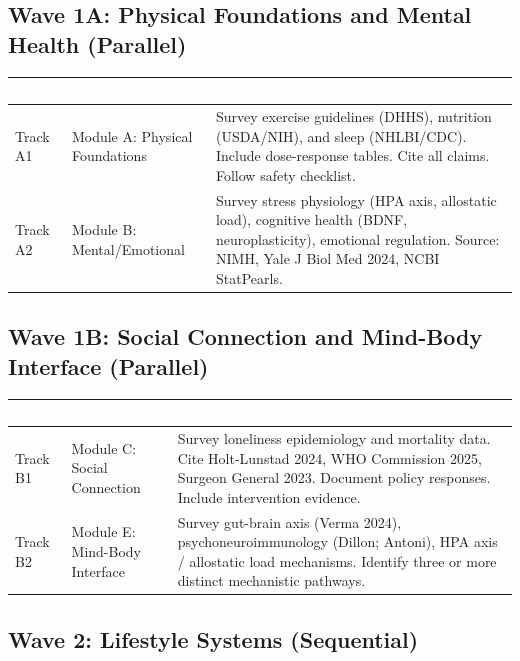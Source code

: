 \documentclass[11pt,letterpaper]{article}
\newcommand{\tableheader}[1]{\textbf{\sffamily\textcolor{white}{#1}}}
\begin{document}
\subsection{Wave 1A: Physical Foundations and Mental Health (Parallel)}

\begin{center}
\begin{tabularx}{\textwidth}{L{2cm}L{4cm}X}
\toprule
{}
\tableheader{Track} & \tableheader{Module} & \tableheader{Agent Instructions} \\
\midrule
Track A1 & Module A: Physical Foundations & Survey exercise guidelines (DHHS), nutrition (USDA/NIH), and sleep (NHLBI/CDC). Include dose-response tables. Cite all claims. Follow safety checklist. \\
Track A2 & Module B: Mental/Emotional & Survey stress physiology (HPA axis, allostatic load), cognitive health (BDNF, neuroplasticity), emotional regulation. Source: NIMH, Yale J Biol Med 2024, NCBI StatPearls. \\
\bottomrule
\end{tabularx}
\end{center}

\subsection{Wave 1B: Social Connection and Mind-Body Interface (Parallel)}

\begin{center}
\begin{tabularx}{\textwidth}{L{2cm}L{4cm}X}
\toprule
{}
\tableheader{Track} & \tableheader{Module} & \tableheader{Agent Instructions} \\
\midrule
Track B1 & Module C: Social Connection & Survey loneliness epidemiology and mortality data. Cite Holt-Lunstad 2024, WHO Commission 2025, Surgeon General 2023. Document policy responses. Include intervention evidence. \\
Track B2 & Module E: Mind-Body Interface & Survey gut-brain axis (Verma 2024), psychoneuroimmunology (Dillon; Antoni), HPA axis / allostatic load mechanisms. Identify three or more distinct mechanistic pathways. \\
\bottomrule
\end{tabularx}
\end{center}

\subsection{Wave 2: Lifestyle Systems (Sequential)}
\end{document}

